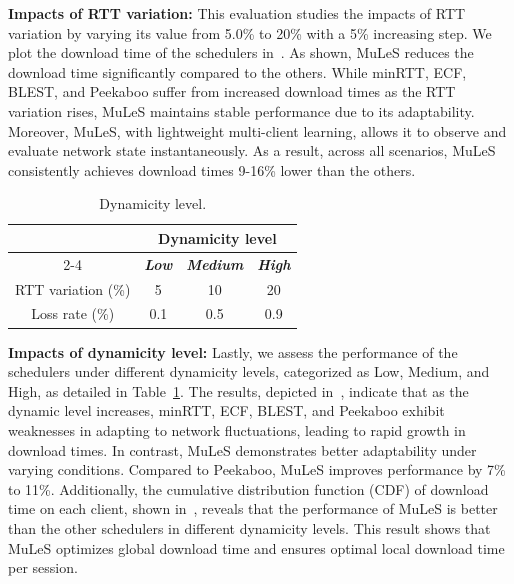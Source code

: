 \noindent \textbf{Impacts of RTT variation:} This evaluation studies the impacts of RTT variation by varying its value from 5.0\% to 20\% with a 5\% increasing step. We plot the download time of the schedulers in~. As shown, MuLeS reduces the download time significantly compared to the others. While minRTT, ECF, BLEST, and Peekaboo suffer from increased download times as the RTT variation rises, MuLeS maintains stable performance due to its adaptability. Moreover, MuLeS, with lightweight multi-client learning, allows it to observe and evaluate network state instantaneously. As a result, across all scenarios, MuLeS consistently achieves download times 9-16\% lower than the others.%

\begin{table}[t]
\begin{center}
\caption{Dynamicity level.}
\label{tab2}
\begin{tabular}{|c|c|c|c|}
\hline
\textbf{}&\multicolumn{3}{|c|}{\textbf{Dynamicity level}} \\
\cline{2-4} 
\textbf{} & \textbf{\textit{Low}}& \textbf{\textit{Medium}}& \textbf{\textit{High}} \\
\hline
RTT variation (\%)& 5& 10& 20   \\
\hline
Loss rate (\%)& 0.1& 0.5& 0.9  \\
\hline
\end{tabular}
\end{center}
\end{table}
\noindent \textbf{Impacts of dynamicity level:}
Lastly, we assess the performance of the schedulers under different dynamicity levels, categorized as Low, Medium, and High, as detailed in Table~\ref{tab2}. The results, depicted in~, indicate that as the dynamic level increases, minRTT, ECF, BLEST, and Peekaboo exhibit weaknesses in adapting to network fluctuations, leading to rapid growth in download times. In contrast, MuLeS demonstrates better adaptability under varying conditions. Compared to Peekaboo, MuLeS improves performance by 7\% to 11\%. Additionally, the cumulative distribution function (CDF) of download time on each client, shown in~, reveals that the performance of MuLeS is better than the other schedulers in different dynamicity levels. This result shows that MuLeS optimizes global download time and ensures optimal local download time per session.

